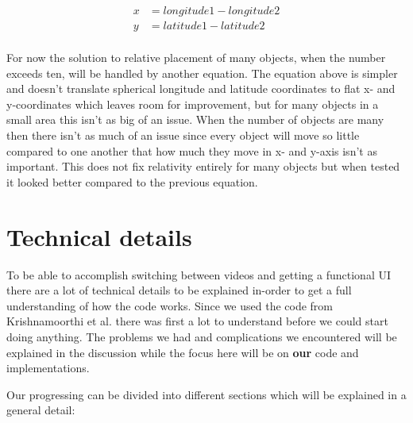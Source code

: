 
\begin{align*}
x &= longitude1-longitude2  \\
y &= latitude1-latitude2 \\
\end{align*}

For now the solution to relative placement of many objects, when the number exceeds ten, will be handled by another equation. The equation above is simpler and doesn't translate spherical longitude and latitude coordinates to flat x- and y-coordinates which leaves room for improvement, but for many objects in a small area this isn't as big of an issue. When the number of objects are many then there isn't as much of an issue since every object will move so little compared to one another that how much they move in x- and y-axis isn't as important. This does not fix relativity entirely for many objects but when tested it looked better compared to the previous equation. 

\section{Technical details}
\label{sec:technicaldetails}

To be able to accomplish switching between videos and getting a functional UI there are a lot of technical details to be explained in-order to get a full understanding of how the code works. Since we used the code from Krishnamoorthi et al.\cite{qualbranch} there was first a lot to understand before we could start doing anything. The problems we had and complications we encountered will be explained in the discussion while the focus here will be on \textbf{our} code and implementations. 

Our progressing can be divided into different sections which will be explained in a general detail:

